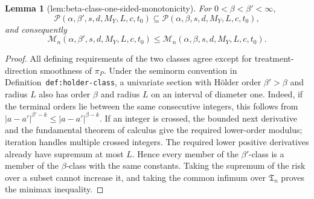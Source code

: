 \documentclass{article}
\newtheorem{lemma}{Lemma}
\begin{document}
\begin{lemma}[lem:beta-class-one-sided-monotonicity]\label{lem:beta-class-one-sided-monotonicity}
For \(0<\beta<\beta'<\infty\),
\[
\mathcal P(\alpha,\beta',s,d,M_Y,L,c,t_0)\subseteq\mathcal P(\alpha,\beta,s,d,M_Y,L,c,t_0),
\]
and consequently
\[
\mathcal M_n(\alpha,\beta',s,d,M_Y,L,c,t_0)\le\mathcal M_n(\alpha,\beta,s,d,M_Y,L,c,t_0).
\]
\end{lemma}
\begin{proof}
All defining requirements of the two classes agree except for treatment-direction smoothness of \(\pi_P\). Under the seminorm convention in Definition~\texttt{def:holder-class}, a univariate section with H\"older order \(\beta'>\beta\) and radius \(L\) also has order \(\beta\) and radius \(L\) on an interval of diameter one. Indeed, if the terminal orders lie between the same consecutive integers, this follows from \(\lvert a-a'\rvert^{\beta'-k}\le\lvert a-a'\rvert^{\beta-k}\). If an integer is crossed, the bounded next derivative and the fundamental theorem of calculus give the required lower-order modulus; iteration handles multiple crossed integers. The required lower positive derivatives already have supremum at most \(L\). Hence every member of the \(\beta'\)-class is a member of the \(\beta\)-class with the same constants. Taking the supremum of the risk over a subset cannot increase it, and taking the common infimum over \(\mathfrak T_n\) proves the minimax inequality.
\end{proof}
\end{document}
